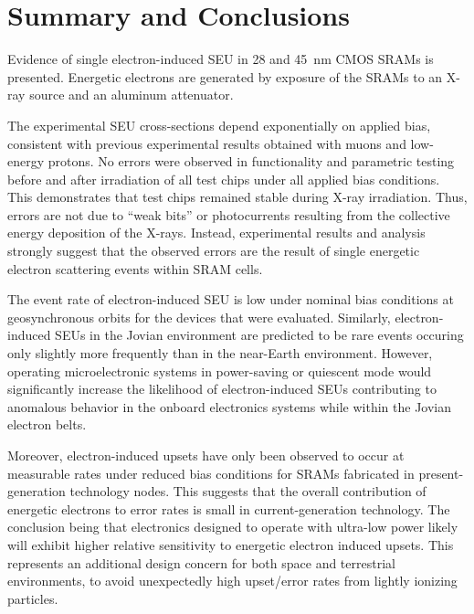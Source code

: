 \chapter{Summary and Conclusions} %
\label{cha:summary_and_conclusions}
Evidence of single electron-induced SEU in 28 and 45~nm CMOS SRAMs is presented. 
Energetic electrons are generated by exposure of the SRAMs to an X-ray source and an aluminum attenuator. 

The experimental SEU cross-sections depend exponentially on applied bias, consistent with previous experimental results obtained with muons and low-energy protons. 
No errors were observed in functionality and parametric testing before and after irradiation of all test chips under all applied bias conditions. 
This demonstrates that test chips remained stable during X-ray irradiation. 
Thus, errors are not due to ``weak bits'' or photocurrents resulting from the collective energy deposition of the X-rays. 
Instead, experimental results and analysis strongly suggest that the observed errors are the result of single energetic electron scattering events within SRAM cells. 

The event rate of electron-induced SEU is low under nominal bias conditions at geosynchronous orbits for the devices that were evaluated. 
Similarly, electron-induced SEUs in the Jovian environment are predicted to be rare events occuring only slightly more frequently than in the near-Earth environment.
However, operating microelectronic systems in power-saving or quiescent mode would significantly increase the likelihood of electron-induced SEUs contributing to anomalous behavior in the onboard electronics systems while within the Jovian electron belts.

Moreover, electron-induced upsets have only been observed to occur at measurable rates under reduced bias conditions for SRAMs fabricated in present-generation technology nodes. 
This suggests that the overall contribution of energetic electrons to error rates is small in current-generation technology.
The conclusion being that electronics designed to operate with ultra-low power likely will exhibit higher relative sensitivity to energetic electron induced upsets. 
This represents an additional design concern for both space and terrestrial environments, to avoid unexpectedly high upset/error rates from lightly ionizing particles.

